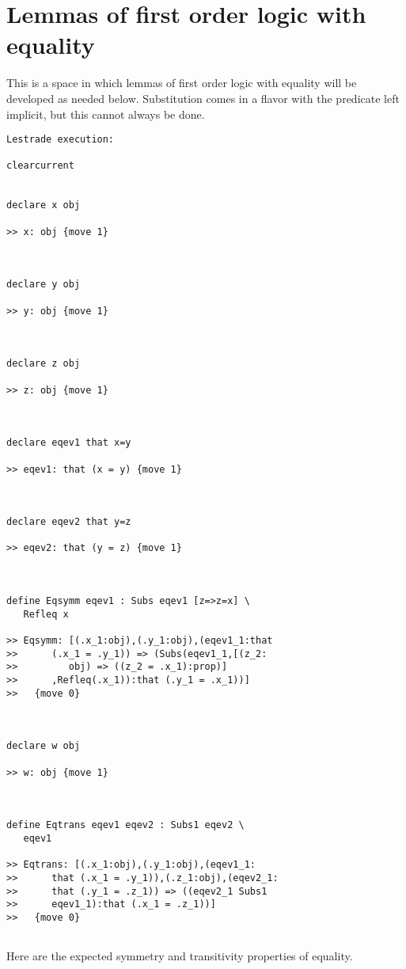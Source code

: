 \documentclass[12pt]{article}
\begin{document}
\section{Lemmas of first order logic with equality}

This is a space in which lemmas of first order logic with equality will be developed as needed below.  Substitution comes in a flavor with the predicate left implicit, but this cannot always be done.

\begin{verbatim}Lestrade execution:

clearcurrent


declare x obj

>> x: obj {move 1}



declare y obj

>> y: obj {move 1}



declare z obj

>> z: obj {move 1}



declare eqev1 that x=y

>> eqev1: that (x = y) {move 1}



declare eqev2 that y=z

>> eqev2: that (y = z) {move 1}



define Eqsymm eqev1 : Subs eqev1 [z=>z=x] \
   Refleq x

>> Eqsymm: [(.x_1:obj),(.y_1:obj),(eqev1_1:that
>>      (.x_1 = .y_1)) => (Subs(eqev1_1,[(z_2:
>>         obj) => ((z_2 = .x_1):prop)]
>>      ,Refleq(.x_1)):that (.y_1 = .x_1))]
>>   {move 0}



declare w obj

>> w: obj {move 1}



define Eqtrans eqev1 eqev2 : Subs1 eqev2 \
   eqev1

>> Eqtrans: [(.x_1:obj),(.y_1:obj),(eqev1_1:
>>      that (.x_1 = .y_1)),(.z_1:obj),(eqev2_1:
>>      that (.y_1 = .z_1)) => ((eqev2_1 Subs1
>>      eqev1_1):that (.x_1 = .z_1))]
>>   {move 0}


\end{verbatim}

Here are the expected symmetry and transitivity properties of equality.
\end{document}
